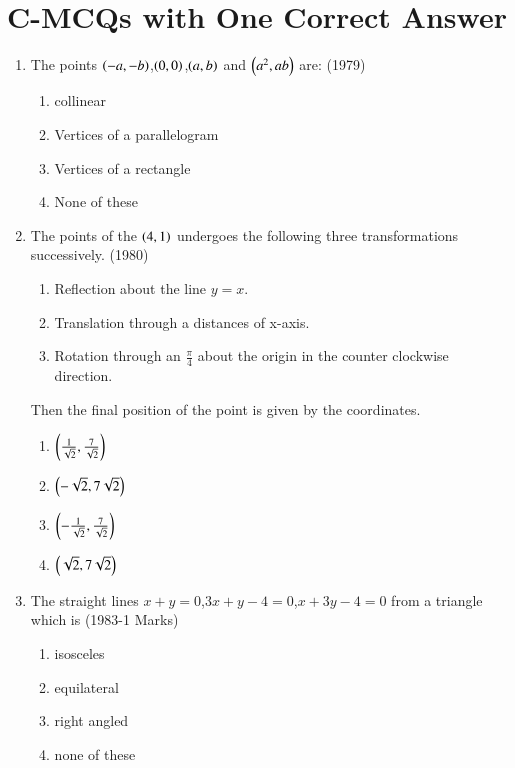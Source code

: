 \documentclass[journal,12pt,twocolumn]{IEEEtran}
\theoremstyle{remark}
\begin{document}
\section {C-MCQs with One Correct Answer}
\begin{enumerate}
	\item The points $\left(-a,-b\right)$,$\left(0,0\right)$,$\left(a,b\right)$ and $\left(a^2,ab\right)$ are:
    \hfill(1979)
    \begin{enumerate}
        \item collinear
        \item Vertices of a parallelogram
        \item Vertices of a rectangle 
        \item None of these
    \end{enumerate}
    \item The points of the $\left(4,1\right)$ undergoes the following three transformations successively.
    \hfill(1980)
    \begin{enumerate}
        \item Reflection about the line $y=x$.
        \item Translation through a distances of x-axis.
        \item Rotation through an $\frac{\pi}{4}$ about the origin in the counter clockwise direction.
    \end{enumerate}
    Then the final position of the point is given by the coordinates.
    \begin{multicols}{2} 		
    \begin{enumerate}
        \item $\left(\frac{1}{\sqrt{2}},\frac{7}{\sqrt{2}}\right)$
	\item $\left(-\sqrt{2},7\sqrt{2}\right)$
	\item $\left(-\frac{1}{\sqrt{2}},\frac{7}{\sqrt{2}}\right)$
	\item $\left(\sqrt{2},7\sqrt{2}\right)$
    \end{enumerate} 
    \end{multicols}	    
    \item The straight lines $x+y=0$,$3x+y-4=0$,$x+3y-4=0$ from a triangle which is 
    \hfill(1983-1 Marks)
    \begin{multicols}{2}	
    \begin{enumerate}
        \item isosceles
        \item equilateral 
        \item right angled
        \item none of these

\end{enumerate}
\end{multicols}
\end{enumerate}
\end{document}
